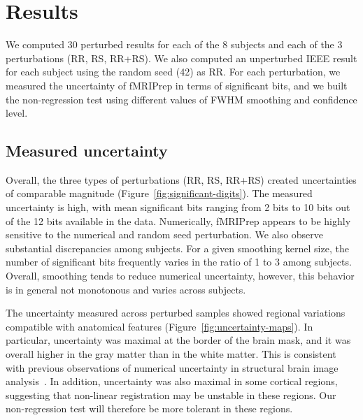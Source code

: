 \documentclass{article}
\newcommand{\fmriprep}{fMRIPrep\xspace}
\begin{document}
\section{Results}

We computed 30 perturbed results for each of the 8 subjects and each of the 3 perturbations (RR, RS, RR+RS). We also computed an unperturbed IEEE result for each subject using the random seed (42) as RR. For each perturbation, we measured the uncertainty of fMRIPrep in terms of significant bits, and we built the non-regression test using different values of FWHM smoothing and confidence level.

\subsection{Measured uncertainty}

Overall, the three types of perturbations (RR, RS, RR+RS) created uncertainties of comparable magnitude (Figure~\ref{fig:significant-digits}). The measured uncertainty is high, with mean significant bits ranging from 2 bits to 10 bits out of the 12 bits available in the data. Numerically, \fmriprep appears to be highly sensitive to the numerical and random seed perturbation. We also observe substantial discrepancies among subjects. For a given smoothing kernel size, the number of significant bits frequently varies in the ratio of 1 to 3 among subjects. Overall, smoothing tends to reduce numerical uncertainty, however, this behavior is in general not monotonous and varies across subjects.

The uncertainty measured across perturbed samples showed regional variations compatible with anatomical features (Figure~\ref{fig:uncertainty-maps}). In particular, uncertainty was maximal at the border of the brain mask, and it was overall higher in the gray matter than in the white matter. This is consistent with previous observations of numerical uncertainty in structural brain image analysis~\cite{salari2021accurate}. In addition, uncertainty was also maximal in some cortical regions, suggesting that non-linear registration may be unstable in these regions. Our non-regression test will therefore be more tolerant in these regions.
\end{document}
